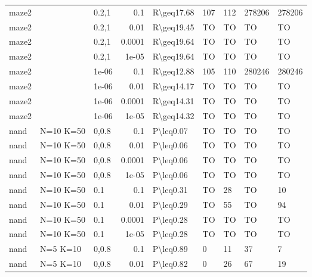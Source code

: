 \begin{longtable}{lllrlllll}
 maze2         &           & 0.2,1 & 0.1    & R\textbackslash{}geq17.68 & 107  & 112  & 278206   & 278206  \\
 maze2         &           & 0.2,1 & 0.01   & R\textbackslash{}geq19.45 & TO   & TO   & TO       & TO      \\
 maze2         &           & 0.2,1 & 0.0001 & R\textbackslash{}geq19.64 & TO   & TO   & TO       & TO      \\
 maze2         &           & 0.2,1 & 1e-05  & R\textbackslash{}geq19.64 & TO   & TO   & TO       & TO      \\
 maze2         &           & 1e-06 & 0.1    & R\textbackslash{}geq12.88 & 105  & 110  & 280246   & 280246  \\
 maze2         &           & 1e-06 & 0.01   & R\textbackslash{}geq14.17 & TO   & TO   & TO       & TO      \\
 maze2         &           & 1e-06 & 0.0001 & R\textbackslash{}geq14.31 & TO   & TO   & TO       & TO      \\
 maze2         &           & 1e-06 & 1e-05  & R\textbackslash{}geq14.32 & TO   & TO   & TO       & TO      \\
 nand          & N=10 K=50 & 0,0.8 & 0.1    & P\textbackslash{}leq0.07  & TO   & TO   & TO       & TO      \\
 nand          & N=10 K=50 & 0,0.8 & 0.01   & P\textbackslash{}leq0.06  & TO   & TO   & TO       & TO      \\
 nand          & N=10 K=50 & 0,0.8 & 0.0001 & P\textbackslash{}leq0.06  & TO   & TO   & TO       & TO      \\
 nand          & N=10 K=50 & 0,0.8 & 1e-05  & P\textbackslash{}leq0.06  & TO   & TO   & TO       & TO      \\
 nand          & N=10 K=50 & 0.1   & 0.1    & P\textbackslash{}leq0.31  & TO   & 28   & TO       & 10      \\
 nand          & N=10 K=50 & 0.1   & 0.01   & P\textbackslash{}leq0.29  & TO   & 55   & TO       & 94      \\
 nand          & N=10 K=50 & 0.1   & 0.0001 & P\textbackslash{}leq0.28  & TO   & TO   & TO       & TO      \\
 nand          & N=10 K=50 & 0.1   & 1e-05  & P\textbackslash{}leq0.28  & TO   & TO   & TO       & TO      \\
 nand          & N=5 K=10  & 0,0.8 & 0.1    & P\textbackslash{}leq0.89  & 0    & 11   & 37       & 7       \\
 nand          & N=5 K=10  & 0,0.8 & 0.01   & P\textbackslash{}leq0.82  & 0    & 26   & 67       & 19      \\

\end{longtable}
